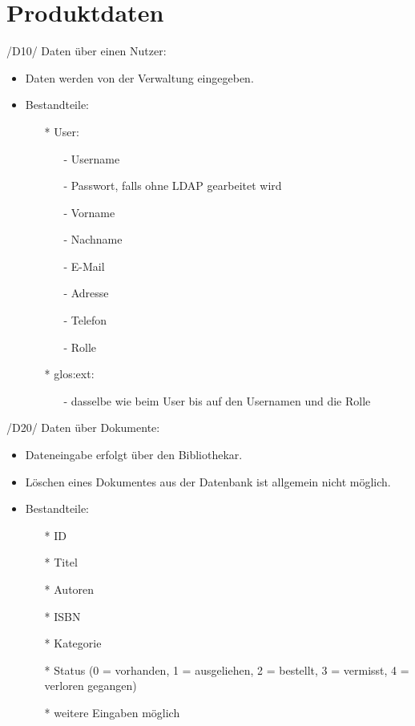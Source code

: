 
\chapter{Produktdaten}
/D10/ Daten über einen Nutzer:
\begin{itemize}
  \item Daten werden von der Verwaltung eingegeben.
  \item Bestandteile:
  \begin{itemize}
    \item[*] User:
    \begin{itemize}
      \item[-] Username
      \item[-] Passwort, falls ohne \gls{LDAP} gearbeitet wird
      \item[-] Vorname
      \item[-] Nachname
      \item[-] E-Mail
      \item[-] Adresse
      \item[-] Telefon
      \item[-] Rolle
    \end{itemize}
    \item[*] \gls{glos:ext}:
    \begin{itemize}
      \item[-] dasselbe wie beim User bis auf den Usernamen und die Rolle
    \end{itemize}
  \end{itemize}
\end{itemize}

\newpage

/D20/ Daten über Dokumente:
\begin{itemize}
  \item Dateneingabe erfolgt über den Bibliothekar.
  \item Löschen eines Dokumentes aus der Datenbank ist allgemein nicht möglich.
  \item Bestandteile:
  \begin{itemize}
    \item[*] ID
    \item[*] Titel
    \item[*] Autoren
    \item[*] ISBN
    \item[*] Kategorie
    \item[*] Status (0 = vorhanden, 1 = ausgeliehen, 2 = bestellt, 3 = vermisst, 4 = verloren gegangen)
    \item[*] weitere Eingaben möglich
  \end{itemize}
\end{itemize}

